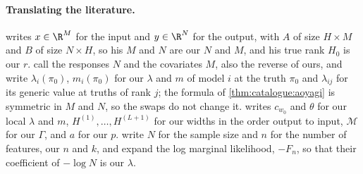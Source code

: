 \begin{refsection}
\paragraph{Translating the literature.} \Textcite{Watanabe2013} writes $x\in\R^M$ for the input and $y\in\R^N$ for the output, with $A$ of size $H\times M$ and $B$ of size $N\times H$, so his $M$ and $N$ are our $N$ and $M$, and his true rank $H_0$ is our $r$. \Textcite{DrtonPlummer2017} call the responses $N$ and the covariates $M$, also the reverse of ours, and write $\lambda_i(\pi_0)$, $m_i(\pi_0)$ for our $\lambda$ and $m$ of model $i$ at the truth $\pi_0$ and $\lambda_{ij}$ for its generic value at truths of rank $j$; the formula of \cref{thm:catalogue:aoyagi} is symmetric in $M$ and $N$, so the swaps do not change it. \Textcite{Aoyagi2025} writes $c_{w_0}$ and $\theta$ for our local $\lambda$ and $m$, $H^{(1)},\dots,H^{(L+1)}$ for our widths in the order output to input, $\mathcal M$ for our $\Gamma$, and $a$ for our $p$. \Textcite{RusakovGeiger2005} write $N$ for the sample size and $n$ for the number of features, our $n$ and $k$, and expand the log marginal likelihood, $-F_n$, so that their coefficient of $-\log N$ is our $\lambda$.

\printchapterbib
\end{refsection}
